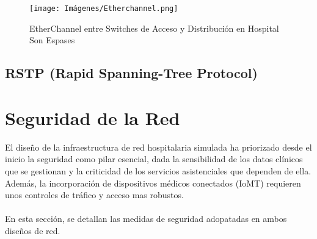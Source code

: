 \begin{figure}[H]
    \centering
    \texttt{[image: Imágenes/Etherchannel.png]}
    \caption{EtherChannel entre Switches de Acceso y Distribución en Hospital Son Espases}
    \label{fig:EtherChannel}
\end{figure}

\subsection{RSTP (Rapid Spanning-Tree Protocol)}


\section{Seguridad de la Red}
El diseño de la infraestructura de red hospitalaria simulada ha priorizado desde el inicio la seguridad como pilar esencial, dada la sensibilidad de los datos clínicos que se 
gestionan y la criticidad de los servicios asistenciales que dependen de ella. Además, la incorporación de dispositivos médicos conectados (IoMT) requieren unos controles de tráfico y 
acceso mas robustos.
\\ \\
En esta sección, se detallan las medidas de seguridad adopatadas en ambos diseños de red.
